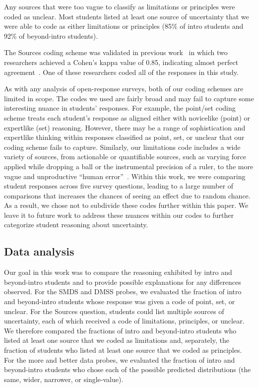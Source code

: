 \documentclass[english,aps,prstper,reprint,showpacs,longbibliography,superscriptaddress,nofootinbib]{revtex4-2}
\begin{document}
Any sources that were too vague to classify as limitations or principles were coded as unclear. Most students listed at least one source of uncertainty that we were able to code as either limitations or principles (85\% of intro students and 92\% of beyond-intro students).

The Sources coding scheme was validated in previous work~\cite{StumpTBD} in which two researchers achieved a Cohen's kappa value of 0.85, indicating almost perfect agreement~\cite{Landis1977}. One of these researchers coded all of the responses in this study.

As with any analysis of open-response surveys, both of our coding schemes are limited in scope. The codes we used are fairly broad and may fail to capture some interesting nuance in students' responses. For example, the point/set coding scheme treats each student's response as aligned either with novicelike (point) or expertlike (set) reasoning. However, there may be a range of sophistication and expertlike thinking within responses classified as point, set, or unclear that our coding scheme fails to capture. Similarly, our limitations code includes a wide variety of sources, from actionable or quantifiable sources, such as varying force applied while dropping a ball or the instrumental precision of a ruler, to the more vague and unproductive ``human error''~\cite{Hu2018,Holmes2015,Sere2001,Evangelinos2002,Allie2003}. Within this work, we were comparing student responses across five survey questions, leading to a large number of comparisons that increases the chances of seeing an effect due to random chance. As a result, we chose not to subdivide these codes further within this paper. We leave it to future work to address these nuances within our codes to further categorize student reasoning about uncertainty.

\subsection{Data analysis}

Our goal in this work was to compare the reasoning exhibited by intro and beyond-intro students and to provide possible explanations for any differences observed. For the SMDS and DMSS probes, we evaluated the fraction of intro and beyond-intro students whose response was given a code of point, set, or unclear. For the Sources question, students could list multiple sources of uncertainty, each of which received a code of limitations, principles, or unclear. We therefore compared the fractions of intro and beyond-intro students who listed at least one source that we coded as limitations and, separately, the fraction of students who listed at least one source that we coded as principles. For the more and better data probes, we evaluated the fraction of intro and beyond-intro students who chose each of the possible predicted distributions (the same, wider, narrower, or single-value).
\end{document}
